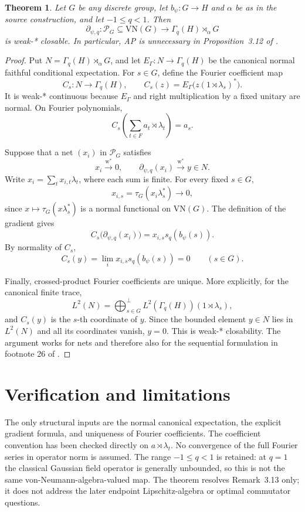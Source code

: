 \documentclass[11pt]{article}
\newtheorem{theorem}{Theorem}
\newcommand{\VN}{\mathrm{VN}}
\newcommand{\PG}{\mathcal P_G}
\newcommand{\wstar}{\mathrm{w}^*}
\begin{document}
\begin{theorem}
Let $G$ be any discrete group, let $b_\psi:G\to H$ and $\alpha$ be as in the
source construction, and let $-1\le q<1$.  Then
\[
 \partial_{\psi,q}:\PG\subseteq\VN(G)
 \longrightarrow \Gamma_q(H)\rtimes_\alpha G
\]
is weak-* closable.  In particular, AP is unnecessary in
Proposition~3.12 of \cite{AK}.
\end{theorem}

\begin{proof}
Put $N=\Gamma_q(H)\rtimes_\alpha G$, and let
$E_\Gamma:N\to\Gamma_q(H)$ be the canonical normal faithful conditional
expectation.  For $s\in G$, define the Fourier coefficient map
\[
 C_s:N\longrightarrow\Gamma_q(H),
 \qquad C_s(z)=E_\Gamma\bigl(z(1\rtimes\lambda_s)^*\bigr).
\]
It is weak-* continuous because $E_\Gamma$ and right multiplication by a fixed
unitary are normal.  On Fourier polynomials,
\[
 C_s\left(\sum_{t\in F}a_t\rtimes\lambda_t\right)=a_s.
\]

Suppose that a net $(x_i)$ in $\PG$ satisfies
\[
 x_i\xrightarrow{\wstar}0,
 \qquad
 \partial_{\psi,q}(x_i)\xrightarrow{\wstar}y\in N.
\]
Write $x_i=\sum_t x_{i,t}\lambda_t$, where each sum is finite.  For every
fixed $s\in G$,
\[
 x_{i,s}=\tau_G(x_i\lambda_s^*)\longrightarrow0,
\]
since $x\mapsto\tau_G(x\lambda_s^*)$ is a normal functional on $\VN(G)$.
The definition of the gradient gives
\[
 C_s\bigl(\partial_{\psi,q}(x_i)\bigr)
 =x_{i,s}s_q(b_\psi(s)).
\]
By normality of $C_s$,
\[
 C_s(y)=\lim_i x_{i,s}s_q(b_\psi(s))=0
 \qquad(s\in G).
\]

Finally, crossed-product Fourier coefficients are unique.  More explicitly,
for the canonical finite trace,
\[
 L^2(N)=\bigoplus_{s\in G}^{\perp}
 L^2(\Gamma_q(H))(1\rtimes\lambda_s),
\]
and $C_s(y)$ is the $s$-th coordinate of $y$.  Since the bounded element
$y\in N$ lies in $L^2(N)$ and all its coordinates vanish, $y=0$.  This is
weak-* closability.  The argument works for nets and therefore also for the
sequential formulation in footnote 26 of \cite{AK}.
\end{proof}

\section*{Verification and limitations}
The only structural inputs are the normal canonical expectation, the explicit
gradient formula, and uniqueness of Fourier coefficients.  The coefficient
convention has been checked directly on $a\rtimes\lambda_t$.  No convergence
of the full Fourier series in operator norm is assumed.  The range
$-1\le q<1$ is retained: at $q=1$ the classical Gaussian field operator is
generally unbounded, so this is not the same von-Neumann-algebra-valued map.
The theorem resolves Remark~3.13 only; it does not address the later endpoint
Lipschitz-algebra or optimal commutator questions.
\end{document}
